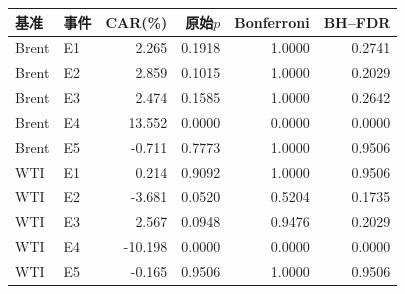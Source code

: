 \begin{tabular}{llrrrr}
\toprule
基准 & 事件 & CAR(\%) & 原始$p$ & Bonferroni & BH--FDR \\
\midrule
Brent & E1 & 2.265 & 0.1918 & 1.0000 & 0.2741 \\
Brent & E2 & 2.859 & 0.1015 & 1.0000 & 0.2029 \\
Brent & E3 & 2.474 & 0.1585 & 1.0000 & 0.2642 \\
Brent & E4 & 13.552 & 0.0000 & 0.0000 & 0.0000 \\
Brent & E5 & -0.711 & 0.7773 & 1.0000 & 0.9506 \\
WTI & E1 & 0.214 & 0.9092 & 1.0000 & 0.9506 \\
WTI & E2 & -3.681 & 0.0520 & 0.5204 & 0.1735 \\
WTI & E3 & 2.567 & 0.0948 & 0.9476 & 0.2029 \\
WTI & E4 & -10.198 & 0.0000 & 0.0000 & 0.0000 \\
WTI & E5 & -0.165 & 0.9506 & 1.0000 & 0.9506 \\
\bottomrule
\end{tabular}
